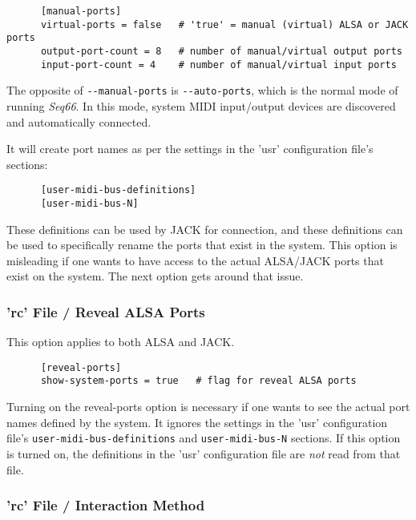    \begin{verbatim}
      [manual-ports]
      virtual-ports = false   # 'true' = manual (virtual) ALSA or JACK ports
      output-port-count = 8   # number of manual/virtual output ports
      input-port-count = 4    # number of manual/virtual input ports
   \end{verbatim}

   The opposite of \texttt{-{}-manual-ports} is \texttt{-{}-auto-ports},
   which is the normal mode of running \textsl{Seq66}.
   In this mode, system MIDI input/output devices are discovered and
   automatically connected.

   It will create port names as per the settings in the 'usr' configuration
   file's sections:

   \begin{verbatim}
      [user-midi-bus-definitions]
      [user-midi-bus-N]
   \end{verbatim}

   These definitions can be used by JACK for connection, and these
   definitions can be used to specifically rename the ports that exist in the
   system.
   This option is misleading if one wants to have access to the
   actual ALSA/JACK ports that exist on the system.
   The next option gets around that issue.

\subsubsection{'rc' File / Reveal ALSA Ports}
\label{subsubsec:configuration_rc_reveal_ports}

   This option applies to both ALSA and JACK.

   \begin{verbatim}
      [reveal-ports]
      show-system-ports = true   # flag for reveal ALSA ports
   \end{verbatim}

   Turning on the reveal-ports option is necessary if one
   wants to see the actual port names defined by the system.
   It ignores the settings in the 'usr' configuration file's
   \texttt{user-midi-bus-definitions} and \texttt{user-midi-bus-N} sections.
   If this option is turned on, the definitions in the
   'usr' configuration file are \textsl{not} read from that file.

\subsubsection{'rc' File / Interaction Method}
\label{subsubsec:configuration_rc_interaction}

